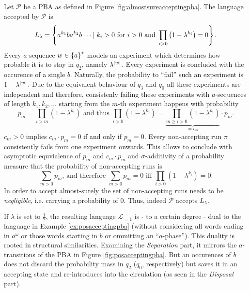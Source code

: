\begin{example}
 \cite{DecProblemsForProbAuto}
  Let $\mathcal{P}$ be a \ac{PBA} as defined in Figure 
  \ref{fig:almostsureacceptingpba}. The language accepted by $\mathcal{P}$ is
  \begin{equation*}
    L_{\lambda} = \left\{a^{k_{1}}ba^{k_{2}}b\dots\mid k_{i}>0\text{ for }i>0
    \text{ and }\prod\limits_{i>0}\left(1-\lambda^{k_{i}}\right) = 0\right\}.
  \end{equation*}
  Every $a$-sequence $w\in\left\{a\right\}^{*}$ models an experiment which determines 
  how probable it is to stay in $q_{2}$, namely $\lambda^{\left\vert{w}\right\vert}$. Every 
  experiment is concluded with the occurence of a single $b$.  Naturally, the 
  probability to \enquote{fail} such an experiment is $1-\lambda^{\left\vert{w}\right\vert}$. 
  Due to the equivalent behaviour of $q_{3}$ and $q_{0}$ all these experiments 
  are independent and therefore, consistenly failing these experiments with 
  $a$-sequences of length $k_{1}, k_{2},\dots$ starting from the $m$-th 
  experiment happens with probability
  \begin{equation*}
    p_{m} = \prod\limits_{i>m}(1-\lambda^{k_{i}})
    \text{ and thus }
    \prod\limits_{i>0}(1-\lambda^{k_{i}}) = 
    \underbrace{\prod\limits_{m\geq i>0}(1-\lambda^{k_{i}})}_{=c_{m}}
    \cdot p_{m}.
  \end{equation*}
  $c_{m} > 0$ implies $c_{m}\cdot p_{m} = 0$ if and only if 
  $p_{m} = 0$.
  Every non-accepting run $\pi$ consistently fails from one experiment onwards.
  This allows to conclude with asymptotic equvialence of $p_{m}$ and 
  $c_{m}\cdot p_{m}$ and $\sigma$-additivity of a probability measure that the 
  probability of non-accepting runs is
  \begin{equation*}
    \sum_{m > 0} p_{m}\text{, and therefore }
    \sum_{m > 0} p_{m} = 0\text{ iff }\prod\limits_{i>0}(1-\lambda^{k_{i}}) =0.
  \end{equation*}
  In order to accept almost-surely the set of non-accepting runs needs to be
  \emph{negligible}, i.e. carrying a probability of $0$.  Thus, indeed 
  $\mathcal{P}$ accepts $L_{\lambda}$.

  If $\lambda$ is set to $\frac{1}{2}$, the resulting language 
  $\mathcal{L}_{=1}$ is - to a certain degree - dual to the language in Example 
  \ref{ex:posacceptingpba} (without considering all words ending in 
  $a^{\omega}$ or those words starting in $b$ or ommitting an 
  \enquote{$a$-phase}). This duality is rooted in structural similarities. 
  Examining the \emph{Separation} part, it mirrors the $a$-transitions of the 
  \ac{PBA} in Figure \ref{fig:posacceptingpba}. But an occurences of $b$ does 
  not discard the probability mass in $q_{2}$ ($q_0$, respectively) but saves
  it in an accepting state and re-introduces into the circulation (as seen in 
  the \emph{Disposal} part).
  \label{ex:almostsureacceptingpba}
\end{example}

